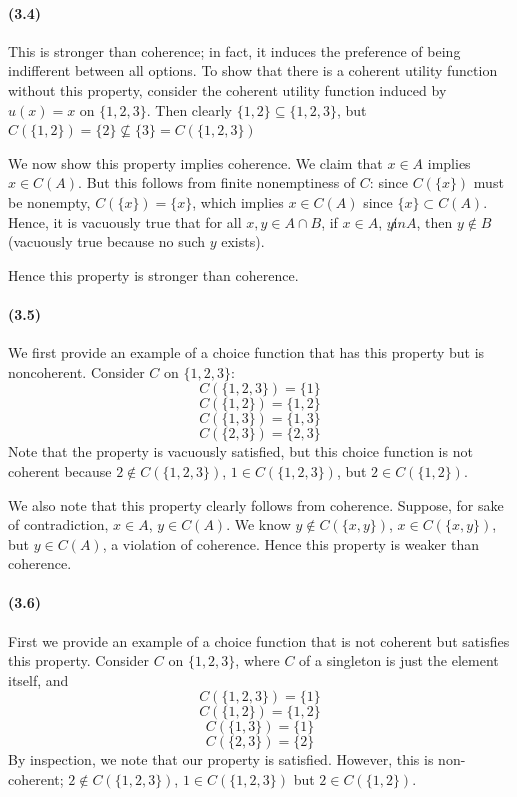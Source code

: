 \documentclass[10pt,letter]{article}
\begin{document}
\paragraph{(3.4)}
This is stronger than coherence; in fact, it induces the preference of being indifferent between all options. To show that there is a coherent utility function without this property, consider the coherent utility function induced by $u(x) = x$ on $\{ 1, 2, 3 \}$. Then clearly $\{ 1, 2 \} \subseteq \{ 1, 2, 3 \}$, but $C(\{ 1, 2 \}) = \{ 2\} \not \subseteq \{ 3 \} = C(\{ 1, 2, 3 \})$

We now show this property implies coherence. We claim that $x \in A$ implies $x \in C(A)$. But this follows from finite nonemptiness of $C$: since $C(\{ x \})$ must be nonempty, $C(\{ x \}) = \{ x \}$, which implies $x \in C(A)$ since $\{ x \} \subset C(A)$. Hence, it is vacuously true that for all $x, y \in A \cap B$, if $x \in A$, $y \not in A$, then $y \not \in B$ (vacuously true because no such $y$ exists).

Hence this property is stronger than coherence.
\paragraph{(3.5)}
We first provide an example of a choice function that has this property but is noncoherent. Consider $C$ on $\{ 1, 2, 3 \}$:
\[ C(\{ 1, 2, 3\}) = \{ 1 \} \]
\[ C(\{ 1, 2\}) = \{ 1, 2 \} \]
\[ C(\{ 1, 3\}) = \{ 1, 3 \} \]
\[ C(\{ 2, 3\}) = \{ 2, 3 \} \]
Note that the property is vacuously satisfied, but this choice function is not coherent because $2 \not \in C(\{ 1 , 2, 3 \})$, $1 \in C(\{ 1, 2, 3 \})$, but $2 \in C(\{ 1, 2 \})$.

We also note that this property clearly follows from coherence. Suppose, for sake of contradiction, $x \in A$, $y \in C(A)$. We know $y \not\in C(\{ x, y \})$, $x \in C(\{ x, y \})$, but $y \in C(A)$, a violation of coherence. Hence this property is weaker than coherence.

\paragraph{(3.6)}
First we provide an example of a choice function that is not coherent but satisfies this property. Consider $C$ on $\{ 1, 2, 3 \}$, where $C$ of a singleton is just the element itself, and
\[ C(\{ 1, 2, 3\}) = \{ 1 \} \]
\[ C(\{ 1, 2\}) = \{ 1, 2 \} \]
\[ C(\{ 1, 3\}) = \{ 1 \} \]
\[ C(\{ 2, 3\}) = \{ 2 \} \]
By inspection, we note that our property is satisfied. However, this is non-coherent; $2 \not \in C(\{ 1, 2, 3\})$, $1 \in C(\{ 1, 2, 3\})$ but $2 \in C(\{ 1, 2 \})$.
\end{document}
